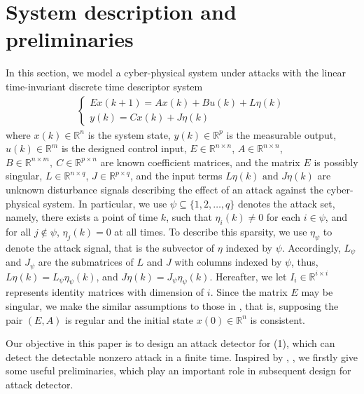 \documentclass[english]{cccconf}
\theoremstyle{definition}
\begin{document}
\section{System description and preliminaries}

In this section, we model a cyber-physical system under attacks with the linear time-invariant discrete time descriptor system
\begin{equation}\begin{split}\begin{cases}
Ex(k+1)=Ax(k)+Bu(k)+L\eta(k)\\
y(k)=Cx(k)+J\eta(k)
\end{cases}\end{split}\end{equation}
where $x(k)\in\mathbb{R}^n$ is the system state, $y(k)\in\mathbb{R}^p$ is the measurable output, $u(k)\in\mathbb{R}^m$ is the designed control input, $E\in\mathbb{R}^{n\times n}$, $A\in\mathbb{R}^{n\times n}$, $B\in\mathbb{R}^{n\times m},\ C\in\mathbb{R}^{p\times n}$ are known coefficient matrices, and the matrix $E$ is possibly singular,   $L\in\mathbb{R}^{n\times q}$, $J\in\mathbb{R}^{p\times q}$, and the input terms $L\eta(k)\text{ and }J\eta(k)$  are unknown disturbance signals describing the effect of an attack against the cyber-physical system. In particular, we use $\psi\subseteq\{1,2,\ldots,q\}$ denotes the attack set, namely, there exists a point of time $k$, such that $\eta_i(k)\neq 0$ for each $i\in\psi$, and for all $j\notin\psi$, $\eta_j(k)=0$ at all times. To describe this sparsity, we use $\eta_\psi$ to denote the attack signal, that is the subvector of $\eta$ indexed by $\psi$. Accordingly, $L_{\psi}$ and $J_{\psi}$ are the submatrices of $L$ and $J$ with columns indexed by $\psi$, thus, $L\eta(k)=L_{\psi}\eta_\psi(k)$, and $J\eta(k)=J_{\psi}\eta_\psi(k)$. Hereafter, we let $I_i\in\mathbb{R}^{i\times i}$ represents identity matrices with dimension of $i$. Since the matrix $E$ may be singular, we make the similar  assumptions to those in \cite{6545301}, that is, supposing the pair $(E,A)$ is regular and the initial state $x(0)\in \mathbb{R}^n$ is consistent.

Our objective in this paper is to design an attack detector for (1), which can detect the detectable nonzero attack in a finite time. Inspired by \cite{Engel2002A}, \cite{Feng2009Finite}, we firstly give some useful preliminaries, which play an important role in subsequent design for attack detector.
\end{document}
